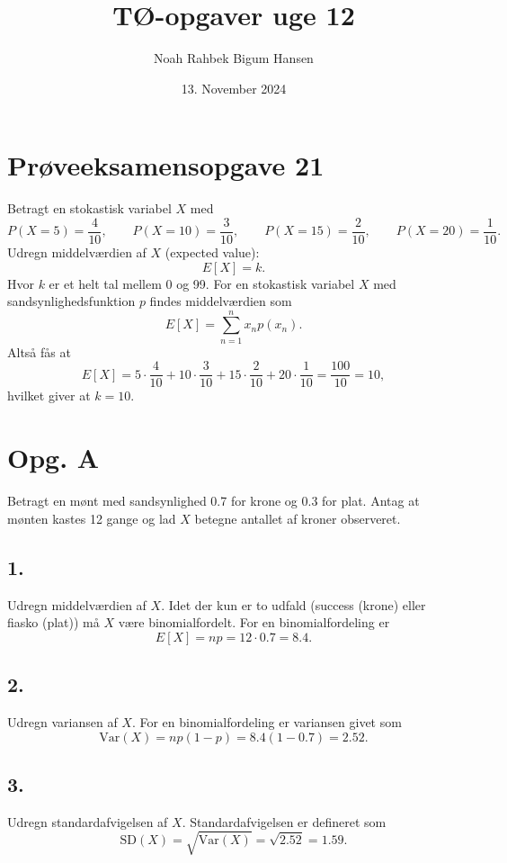 \documentclass[12pt]{article}
\title{TØ-opgaver uge 12}
\author{Noah Rahbek Bigum Hansen}
\date{13. November 2024}
\theoremstyle{definition}
\begin{document}
\maketitle

\section*{Prøveeksamensopgave 21}
Betragt en stokastisk variabel $X$ med
\[ 
P(X = 5) = \frac{4}{10}, \qquad P(X = 10) = \frac{3}{10}, \qquad P(X = 15) = \frac{2}{10}, \qquad P(X = 20) = \frac{1}{10}
.\]
Udregn middelværdien af $X$ (expected value):
\[ 
  E[X] = k
.\]
Hvor $k$ er et helt tal mellem 0 og 99.
\bigbreak
For en stokastisk variabel $X$ med sandsynlighedsfunktion $p$ findes middelværdien som
\[ 
  E[X] =  \sum_{n=1}^{n} x_n p(x_n)
.\]
Altså fås at
\[ 
  E[X] = 5 \cdot \frac{4}{10} + 10 \cdot \frac{3}{10} + 15 \cdot \frac{2}{10} + 20 \cdot  \frac{1}{10} = \frac{100}{10} = 10
,\]
hvilket giver at $k = 10$.


\section*{Opg. A}
Betragt en mønt med sandsynlighed \num{0,7} for krone og \num{0,3} for plat. Antag at mønten kastes 12 gange og lad $X$ betegne antallet af kroner observeret.

\subsection*{1.}
Udregn middelværdien af $X$.
\bigbreak
Idet der kun er to udfald (success (krone) eller fiasko (plat)) må $X$ være binomialfordelt. For en binomialfordeling er
\[ 
  E[X] = np = 12 \cdot \num{0,7} = \num{8,4} 
.\]

\subsection*{2.}
Udregn variansen af $X$.
\bigbreak
For en binomialfordeling er variansen givet som
\[ 
  \mathrm{Var}(X) = np(1-p) = \num{8,4}(1-\num{0,7}) = \num{2,52}  
.\]


\subsection*{3.}
Udregn standardafvigelsen af $X$.
\bigbreak
Standardafvigelsen er defineret som
\[ 
  \mathrm{SD}(X) = \sqrt{\mathrm{Var}(X)} = \sqrt{\num{2,52}} = \num{1,59} 
.\]
\end{document}
